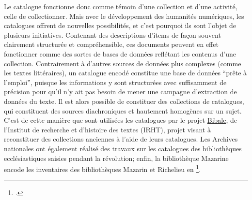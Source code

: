 Le catalogue fonctionne donc comme témoin d'une collection et d'une activité, celle de collectionner. Mais avec le développement des humanités numériques, les catalogues offrent de nouvelles possibilités, et c'est pourquoi ils sont l'objet de plusieurs initiatives. Contenant des descriptions d'items de façon souvent clairement structurée et compréhensible, ces documents peuvent en effet fonctionner comme des sortes de bases de données reflétant les contenus d'une collection. Contrairement à d'autres sources de données plus complexes (comme les textes littéraires), un catalogue encodé constitue une base de données \enquote{prête à l'emploi}, puisque les informations y sont structurées avec suffisamment de précision pour qu'il n'y ait pas besoin de mener une campagne d'extraction de données du texte. Il est alors possible de constituer des collections de catalogues, qui constituent des sources diachroniques et hautement homogènes sur un sujet. C'est de cette manière que sont utilisées les catalogues par le projet \href{https://bibale.irht.cnrs.fr/}{Bibale}, de l'Institut de recherche et d'histoire des textes (IRHT), projet visant à reconstituer des collections anciennes à l'aide de leurs catalogues. Les Archives nationales ont également réalisé des travaux sur les catalogues des bibliothèques ecclésiastiques saisies pendant la révolution; enfin, la bibliothèque Mazarine encode les inventaires des bibliothèques Mazarin et Richelieu en \xmltei{}\footcite[p. 8-9]{rondeau_du_noyer_encoder_2019}. 

